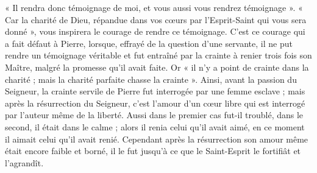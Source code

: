 « Il rendra donc témoignage de moi, et vous aussi vous rendrez témoignage ». « Car la charité de Dieu, répandue dans vos cœurs par l’Esprit-Saint qui vous sera donné », vous inspirera le courage de rendre ce témoignage. C’est ce courage qui a fait défaut à Pierre, lorsque, effrayé de la question d’une servante, il ne put rendre un témoignage véritable et fut entraîné par la crainte à renier trois fois son Maître, malgré la promesse qu’il avait faite. Or « il n’y a point de crainte dans la charité ; mais la charité parfaite chasse la crainte ». Ainsi, avant la passion du Seigneur, la crainte servile de Pierre fut interrogée par une femme esclave ; mais après la résurrection du Seigneur, c’est l’amour d’un cœur libre qui est interrogé par l’auteur même de la liberté. Aussi dans le premier cas fut-il troublé, dans le second, il était dans le calme ; alors il renia celui qu’il avait aimé, en ce moment il aimait celui qu’il avait renié. Cependant après la résurrection son amour même était encore faible et borné, il le fut jusqu’à ce que le Saint-Esprit le fortifiât et l’agrandît.